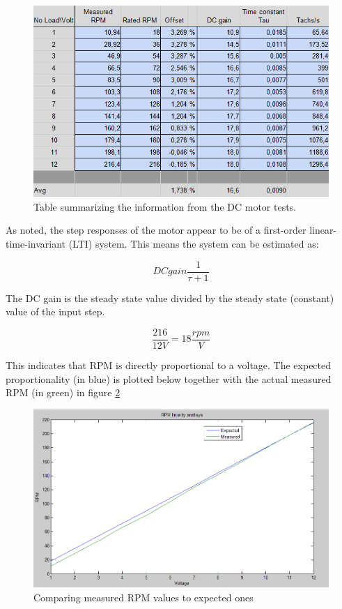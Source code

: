 \begin{figure}[h!]
\centering
\includegraphics[scale=0.7]{Billeder/StepResponseData}
\caption{Table summarizing the information from the DC motor tests.}
\label{fig:StepResponseData}
\end{figure}

As noted, the step responses of the motor appear to be of a first-order linear-time-invariant (LTI) system. This means the system can be estimated as:

\begin{equation}
DCgain\frac{1}{\tau+1}
\end{equation}

The DC gain is the steady state value divided by the steady state (constant) value of the input step.

\begin{equation}
\frac{216}{12V}=18\frac{rpm}{V}
\end{equation}

This indicates that RPM is directly proportional to a voltage. The expected proportionality (in blue) is plotted below together with the actual measured RPM (in green) in figure \ref{fig:RPMLinearityAnalysis}

\begin{figure}[h!]
\centering
\includegraphics[scale=0.4]{Billeder/RPMLinearityAnalysis.png}
\caption{Comparing measured RPM values to expected ones}
\label{fig:RPMLinearityAnalysis}
\end{figure}

